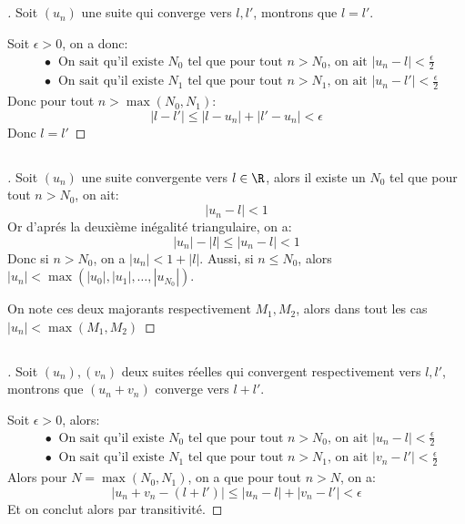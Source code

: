 \documentclass{report}
\begin{document}
   \subsection*{}
   \begin{proof}[\unskip\nopunct]
      Soit \((u_n)\) une suite qui converge vers \(l, l'\), montrons que \(l = l'\).\<

      Soit \(\epsilon > 0\), on a donc: 
      \begin{align*}
         &\bullet \;\; \text{On sait qu'il existe \(N_0\) tel que pour tout \(n > N_0\), on ait \(|u_n - l| < \frac{\epsilon}{2}\)}\\
         &\bullet \;\; \text{On sait qu'il existe \(N_1\) tel que pour tout \(n > N_1\), on ait \(|u_n - l'| < \frac{\epsilon}{2}\)}
      \end{align*}
      Donc pour tout \(n > \max(N_0, N_1)\):
      \[
         |l - l'| \leq |l - u_n| + |l' - u_n| < \epsilon   
      \]
      Donc \(l = l'\)
   \end{proof}

   \subsection*{}
   \begin{proof}[\unskip\nopunct]
   Soit \((u_n)\) une suite convergente vers \(l\in\R\), alors il existe un \(N_0\) tel que pour tout \(n > N_0\), on ait:
   \[
      |u_n - l| < 1    
   \]
   Or d'aprés la deuxième inégalité triangulaire, on a:
   \[
      |u_n| - |l| \leq |u_n - l| < 1
   \]
   Donc si \(n > N_0\), on a \(|u_n| < 1 + |l|\).\+
   Aussi, si \(n \leq N_0\), alors \(|u_n| < \max(|u_0|, |u_1|, \ldots, |u_{N_0}|)\).\<

   On note ces deux majorants respectivement \(M_1, M_2\), alors dans tout les cas \(|u_n| < \max(M_1, M_2)\)
   \end{proof}

   \subsection*{}
   \begin{proof}[\unskip\nopunct]
      Soit \((u_n), (v_n)\) deux suites réelles qui convergent respectivement vers \(l, l'\), montrons que \((u_n + v_n)\) converge vers \(l + l'\).\<

      Soit \(\epsilon > 0\), alors:
      \begin{align*}
         &\bullet \;\; \text{On sait qu'il existe \(N_0\) tel que pour tout \(n > N_0\), on ait \(|u_n - l| < \frac{\epsilon}{2}\)}\\
         &\bullet \;\; \text{On sait qu'il existe \(N_1\) tel que pour tout \(n > N_1\), on ait \(|v_n - l'| < \frac{\epsilon}{2}\)}
      \end{align*}
      Alors pour \(N = \max(N_0, N_1)\), on a que pour tout \(n > N\), on a:
      \[
         |u_n + v_n - (l + l')| \leq |u_n - l| + |v_n - l'| < \epsilon
      \]
      Et on conclut alors par transitivité.
   \end{proof}
\end{document}

